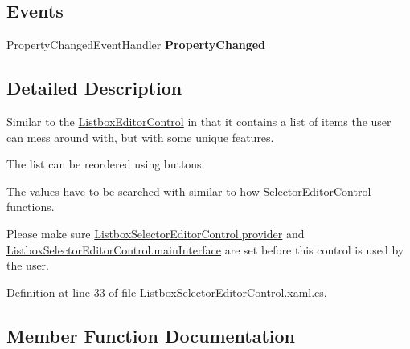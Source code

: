 \subsection*{Events}
\begin{DoxyCompactItemize}
\item 
\mbox{\label{class_aim_1_1_database_interface_1_1_controls_1_1_listbox_selector_editor_control_ad568a84297a225b4deebf797983cb8b6}} 
Property\+Changed\+Event\+Handler {\bfseries Property\+Changed}
\end{DoxyCompactItemize}


\subsection{Detailed Description}
Similar to the \mbox{\hyperlink{class_aim_1_1_database_interface_1_1_controls_1_1_listbox_editor_control}{Listbox\+Editor\+Control}} in that it contains a list of items the user can mess around with, but with some unique features. 

The list can be reordered using buttons.

The values have to be searched with similar to how \mbox{\hyperlink{class_aim_1_1_database_interface_1_1_controls_1_1_selector_editor_control}{Selector\+Editor\+Control}} functions.

Please make sure \mbox{\hyperlink{class_aim_1_1_database_interface_1_1_controls_1_1_listbox_selector_editor_control_a8134970f3f55df8df50e1496d4dcc1bb}{Listbox\+Selector\+Editor\+Control.\+provider}} and \mbox{\hyperlink{class_aim_1_1_database_interface_1_1_controls_1_1_listbox_selector_editor_control_a409017b59b79b775e0dca74f28adc174}{Listbox\+Selector\+Editor\+Control.\+main\+Interface}} are set before this control is used by the user. 

Definition at line 33 of file Listbox\+Selector\+Editor\+Control.\+xaml.\+cs.



\subsection{Member Function Documentation}
\mbox{\label{class_aim_1_1_database_interface_1_1_controls_1_1_listbox_selector_editor_control_a7508972e6d21cd31a8b892e26a26dab1}} 
